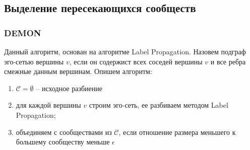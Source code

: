 \subsection{Выделение пересекающихся сообществ}
\subsubsection{DEMON}
Данный алгоритм, основан на алгоритме Label Propagation.
Назовем подграф эго-сетью вершины $v$, если
он содержист всех соседей вершины  $v$ и все ребра
смежные данным вершинам. Опишем алгоритм:
\begin{enumerate}
    \item $\mathcal{C} = \emptyset$ -- исходное разбиение
    \item для каждой вершины $v$ строим эго-сеть, 
        ее разбиваем методом Label Propagation;
    \item объединяем с сообществами из $\mathcal{C}$, 
        если отношение размера меньшего к большему сообществу меньше 
        $\epsilon$
\end{enumerate}
